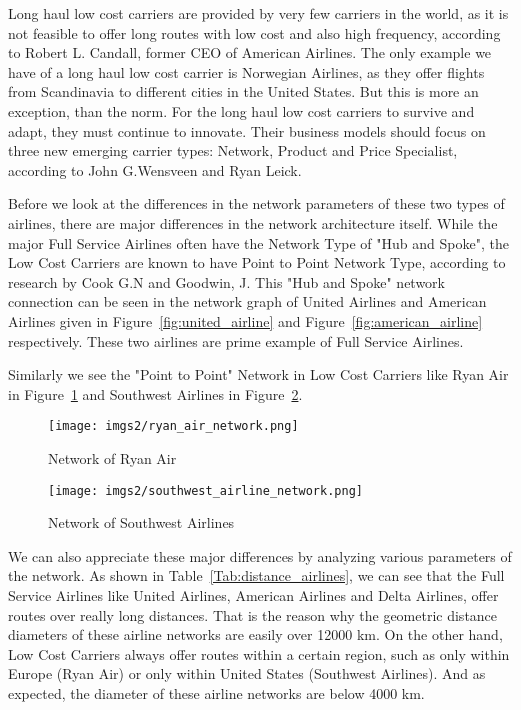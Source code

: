 \documentclass[twocolumn]{tum-article}
\begin{document}
Long haul low cost carriers are provided by very few carriers in the world, as it is not feasible to offer long routes with low cost and also high frequency, according to Robert L. Candall, former CEO of American Airlines.\cite{long_haul_lcc_model}
The only example we have of a long haul low cost carrier is Norwegian Airlines, as they offer flights from Scandinavia to different cities in the United States.
But this is more an exception, than the norm. For the long haul low cost carriers to survive and adapt, they must continue to innovate. Their business models should focus on three new emerging carrier types: Network, Product and Price Specialist, according to John G.Wensveen and Ryan Leick.\cite{long_haul_lcc_new_model}


Before we look at the differences in the network parameters of these two types of airlines, there are major differences in the network architecture itself.
While the major Full Service Airlines often have the Network Type of "Hub and Spoke", the Low Cost Carriers are known to have Point to Point Network Type, according to research by Cook G.N and Goodwin, J.\cite{airline_network_comparison}
This "Hub and Spoke" network connection can be seen in the network graph of United Airlines and American Airlines given in Figure~\ref{fig:united_airline} and Figure~\ref{fig:american_airline} respectively. These two airlines are prime example of Full Service Airlines. 


Similarly we see the "Point to Point" Network in Low Cost Carriers like Ryan Air in Figure~\ref{fig:ryan_air} and Southwest Airlines in Figure~\ref{fig:southwest_airline}.

\begin{figure}
        \centering
        \texttt{[image: imgs2/ryan\_air\_network.png]}
        \caption{
Network of Ryan Air}
        \label{fig:ryan_air}
\end{figure}

\begin{figure}
        \centering
        \texttt{[image: imgs2/southwest\_airline\_network.png]}
        \caption{
Network of Southwest Airlines}
        \label{fig:southwest_airline}
\end{figure}


We can also appreciate these major differences by analyzing various parameters of the network.
As shown in Table~\ref{Tab:distance_airlines}, we can see that the Full Service Airlines like United Airlines, American Airlines and Delta Airlines, offer routes over really long distances.
That is the reason why the geometric distance diameters of these airline networks are easily over 12000 km.
On the other hand, Low Cost Carriers always offer routes within a certain region, such as only within Europe (Ryan Air) or only within United States (Southwest Airlines).
And as expected, the diameter of these airline networks are below 4000 km. 
\end{document}
